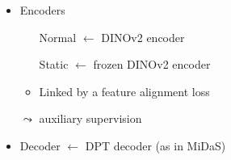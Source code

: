 \documentclass[12pt]{beamer}
\begin{document}
\begin{frame}[noframenumbering]
\begin{columns}
\begin{itemize}
            \item<3-> Encoders
            \begin{itemize}
                \item[Normal] $\leftarrow$ DINOv2 encoder
                \item[Static] $\leftarrow$ frozen DINOv2 encoder
                \item Linked by a feature alignment loss
            \end{itemize}
            $\leadsto$ auxiliary supervision
            
            \item<4-> Decoder $\leftarrow$ DPT decoder (as in MiDaS)
            
        \end{itemize}
    \end{columns}
    
\end{frame}
\end{document}
